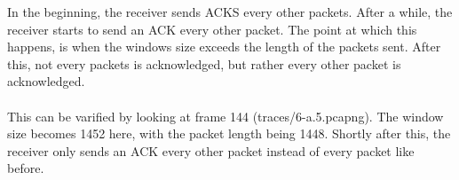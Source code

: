 In the beginning, the receiver sends ACKS every other packets. After a while, the receiver starts to send an ACK every other packet. The point at which this happens, is when the windows size exceeds the length of the packets sent. After this, not every packets is acknowledged, but rather every other packet is acknowledged. \\
\\

This can be varified by looking at frame 144 (traces/6-a.5.pcapng). The window size becomes 1452 here, with the packet length being 1448. Shortly after this, the receiver only sends an ACK every other packet instead of every packet like before.